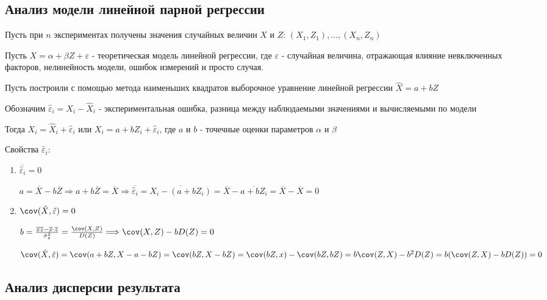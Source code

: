 \documentclass[12pt]{article}
\begin{document}
\subsection{Анализ модели линейной парной регрессии}

Пусть при $n$ экспериментах получены значения случайных величин $X$ и $Z$: $(X_1, Z_1), \dots, (X_n, Z_n)$

Пусть $X = \alpha + \beta Z + \varepsilon$ - теоретическая модель линейной регрессии, где $\varepsilon$ - случайная величина,
отражающая влияние невключенных факторов, нелинейность модели, ошибок измерений и просто случая.

Пусть построили с помощью метода наименьших квадратов выборочное уравнение линейной регрессии $\hat X = a + b Z$

Обозначим $\hat \varepsilon_i = X_i - \hat X_i$ - экспериментальная ошибка, разница между наблюдаемыми значениями и 
вычисляемыми по модели

Тогда $X_i = \hat X_i + \hat \varepsilon_i$ или $X_i = a + b Z_i + \hat \varepsilon_i$, где $a$ и $b$ - точечные оценки параметров $\alpha$ и $\beta$

Свойства $\hat \varepsilon_i$:

\begin{enumerate}
    \item $\overline{\hat \varepsilon_i} = 0$

    \begin{MyProof}
        $a = \overline{X} - b \overline{Z} \Longrightarrow a + b \overline{Z} = \overline{X} \Longrightarrow \overline{\hat \varepsilon_i} = \overline{X_i - (a + b Z_i)} = \overline{X} - \overline{a + b Z_i} = \overline{X} - \overline{X} = 0$
    \end{MyProof}

    \item $\cov (\hat X, \hat \varepsilon) = 0$

    \begin{MyProof}
        $b = \frac{\overline{xz} - \overline{x} \cdot \overline{z}}{\hat \sigma^2_z} = \frac{\cov (X, Z)}{D(Z)} \Longrightarrow \cov (X, Z) - b D(Z) = 0$

        $\cov (\hat X, \hat \varepsilon) = \cov (a + b Z, X - a - bZ) = \cov (bZ, X - bZ) = \cov (bZ, x) - \cov (bZ, bZ) = b \cov (Z, X) - b^2 D(Z) = b (\cov (Z, X) - b D(Z)) = 0$
    \end{MyProof}
\end{enumerate}

\subsection{Анализ дисперсии результата}
\end{document}
